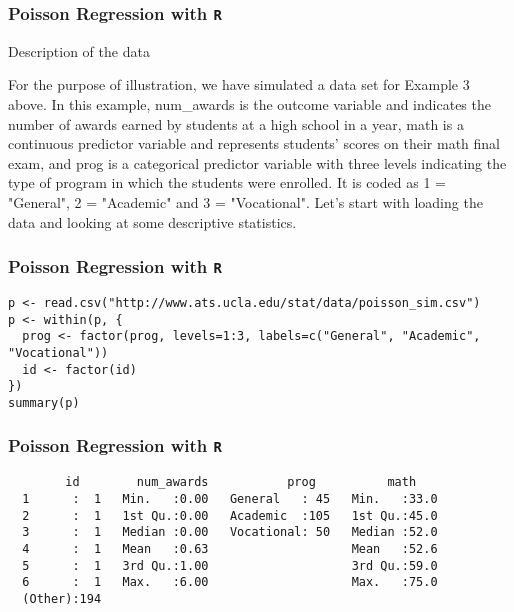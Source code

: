\documentclass[00-GLMregslides.tex]{subfiles}
\begin{document}
\begin{frame}[fragile]

\frametitle{Poisson Regression with \texttt{R}}
\Large
Description of the data

For the purpose of illustration, we have simulated a data set for Example 3 above. In this example, num\_awards is the outcome variable and indicates the number of awards earned by students at a high school in a year, math is a continuous predictor variable and represents students' scores on their math final exam, and prog is a categorical predictor variable with three levels indicating the type of program in which the students were enrolled. It is coded as 1 = "General", 2 = "Academic" and 3 = "Vocational". Let's start with loading the data and looking at some descriptive statistics.
\end{frame}

\begin{frame}[fragile]

\frametitle{Poisson Regression with \texttt{R}}
\Large

\begin{verbatim}
p <- read.csv("http://www.ats.ucla.edu/stat/data/poisson_sim.csv")
p <- within(p, {
  prog <- factor(prog, levels=1:3, labels=c("General", "Academic", "Vocational"))
  id <- factor(id)
})
summary(p)
\end{verbatim}
\end{frame}

\begin{frame}[fragile]
	
	\frametitle{Poisson Regression with \texttt{R}}
	\Large
	
	\begin{verbatim}
        id        num_awards           prog          math     
  1      :  1   Min.   :0.00   General   : 45   Min.   :33.0  
  2      :  1   1st Qu.:0.00   Academic  :105   1st Qu.:45.0  
  3      :  1   Median :0.00   Vocational: 50   Median :52.0  
  4      :  1   Mean   :0.63                    Mean   :52.6  
  5      :  1   3rd Qu.:1.00                    3rd Qu.:59.0  
  6      :  1   Max.   :6.00                    Max.   :75.0  
  (Other):194
\end{verbatim}
\end{frame}
\end{document}
